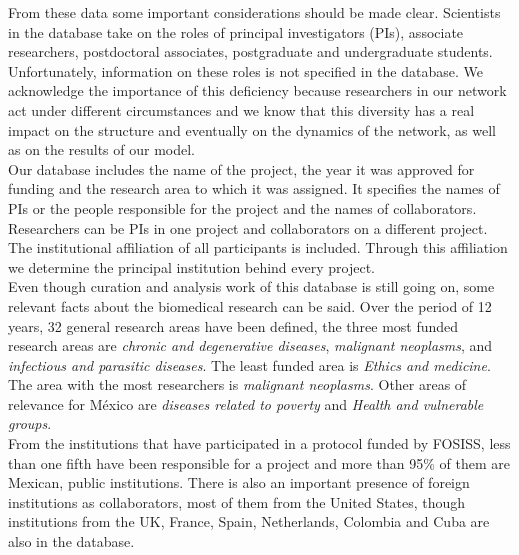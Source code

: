 \documentclass{bmcart}
\begin{document}
From these data some important considerations should be made
clear. Scientists in the database take on the roles of principal
investigators (PIs), associate researchers, postdoctoral associates,
postgraduate and undergraduate students.
Unfortunately, information on these roles is not specified in the database.
We acknowledge the importance of this deficiency because
researchers in our network act under different circumstances and we know
that this diversity has a real impact on the structure and eventually on the
dynamics of the network, as well as on the results of our model.\\  

Our database includes the
name of the project, the year it was approved for funding and the research area
to which it was assigned. It specifies the names of PIs or the people 
responsible for the project and the names of collaborators.
Researchers can be PIs in one project and collaborators on a different project. The institutional
affiliation of all participants is included. Through this affiliation
we determine the principal institution
behind every project.\\ 

Even though curation and analysis work of this database is still going on, some
relevant facts about the biomedical research can be said. Over the period of 12
years, 32 general research areas have been defined, the three most funded
research areas are \emph{chronic and degenerative diseases}, \emph{malignant
  neoplasms}, and \emph{infectious and parasitic diseases}. The least funded
area is \emph{Ethics and medicine}. The area with the most researchers is
\emph{malignant neoplasms}. Other areas of relevance for M\'exico are
\emph{diseases related to poverty} and \emph{Health and vulnerable groups}. \\  

From the institutions that have participated in a protocol funded by FOSISS,
less than one fifth have been responsible for a project and more than 95\% of
them are Mexican, public institutions. There is also an important presence of
foreign institutions as collaborators, most of them from the United States,
though institutions from the UK, France, Spain, Netherlands, Colombia and Cuba
are also in the database.\\ 
\end{document}
